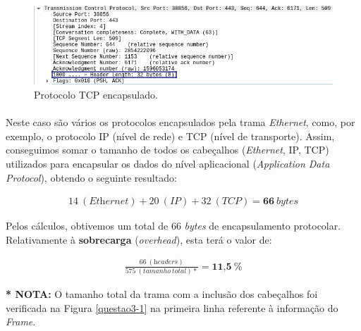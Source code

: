     \begin{figure}[H]
    \centering
    \includegraphics[width=380pt]{prints/Questao3/questao3-TCP.png}
    \caption{Protocolo TCP encapsulado.} \label{questao3-d-TCP}
    \end{figure}
    
    \paragraph{}
    \par Neste caso são vários os protocolos encapsulados pela trama \textit{Ethernet}, como, por exemplo, o protocolo IP (nível de rede) e TCP (nível de transporte). Assim, conseguimos somar o tamanho de todos os cabeçalhos (\textit{Ethernet}, IP, TCP) utilizados para encapsular os dados do nível aplicacional (\textit{Application Data Protocol}), obtendo o seguinte resultado: 
    
    \begin{align*}
        {14 \:(\textit{Ethernet}) + 20 \:(IP) + 32 \:(TCP) = \textbf{66}\:\textit{bytes}}
    \end{align*} 

    
    
    \par Pelos cálculos, obtivemos um total de 66 \textit{bytes} de encapsulamento protocolar. Relativamente à \textbf{sobrecarga} (\textit{overhead}), esta terá o valor de: 
    
    \begin{align*}  
        \frac{66\:(\textit{headers})}{575\:(tamanho\:total)*} = \textbf{11,5}\:\%  
    \end{align*}  
    
    
    \par \textbf{* NOTA:} O tamanho total da trama com a inclusão dos cabeçalhos foi verificada na Figura \ref{questao3-1} na primeira linha referente à informação do \textit{Frame}.  






